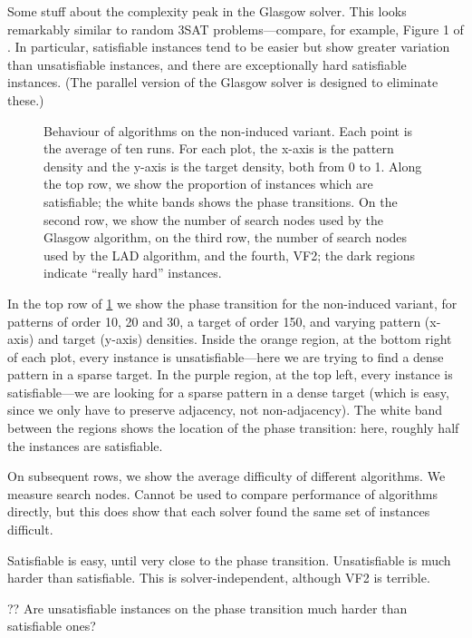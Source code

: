 \documentclass[letterpaper]{article}
\begin{document}
Some stuff about the complexity peak in the Glasgow solver. This looks remarkably similar to random
3SAT problems---compare, for example, Figure 1 of \citet{LeytonBrown:2014}. In particular,
satisfiable instances tend to be easier but show greater variation than unsatisfiable instances, and
there are exceptionally hard satisfiable instances. (The parallel version of the Glasgow solver is
designed to eliminate these.)

\begin{figure}[tb]
    
    \caption{Behaviour of algorithms on the non-induced variant. Each point is the average of ten
        runs. For each plot, the x-axis is the pattern density and the y-axis is the target
        density, both from 0 to 1. Along the top row, we show the proportion of instances which are
        satisfiable; the white bands shows the phase transitions. On the second row, we show the
        number of search nodes used by the Glasgow algorithm, on the third row, the number of
        search nodes used by the LAD algorithm, and the fourth, VF2; the dark regions indicate
        ``really hard'' instances.}
    \label{figure:non-induced}
\end{figure}

In the top row of \cref{figure:non-induced} we show the phase transition for the non-induced
variant, for patterns of order 10, 20 and 30, a target of order 150, and varying pattern (x-axis)
and target (y-axis) densities. Inside the orange region, at the bottom right of each plot, every
instance is unsatisfiable---here we are trying to find a dense pattern in a sparse target. In the
purple region, at the top left, every instance is satisfiable---we are looking for a sparse pattern
in a dense target (which is easy, since we only have to preserve adjacency, not non-adjacency). The
white band between the regions shows the location of the phase transition: here, roughly half the
instances are satisfiable.

On subsequent rows, we show the average difficulty of different algorithms.  We measure search
nodes. Cannot be used to compare performance of algorithms directly, but this does show that each
solver found the same set of instances difficult.

Satisfiable is easy, until very close to the phase transition. Unsatisfiable is much harder than
satisfiable. This is solver-independent, although VF2 is terrible.

?? Are unsatisfiable instances on the phase transition much harder than satisfiable ones?
\end{document}
